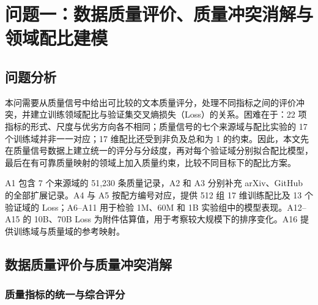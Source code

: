 \setcounter{section}{3}
\section{问题一：数据质量评价、质量冲突消解与领域配比建模}
\label{sec:q1}
\setcounter{equation}{0}
\setcounter{figure}{0}
\setcounter{table}{0}

\subsection{问题分析}

本问需要从质量信号中给出可比较的文本质量评分\cite{fineweb2024}，处理不同指标之间的评价冲突，并建立训练领域配比与验证集交叉熵损失（Loss）的关系。困难在于：22 项指标的形式、尺度与优劣方向各不相同；质量信号的七个来源域与配比实验的 17 个训练域并非一一对应；17 维配比还受到非负及总和为 1 的约束。因此，本文先在质量信号数据上建立统一的评分与分歧度，再对每个验证域分别拟合配比模型，最后在有可靠质量映射的领域上加入质量约束，比较不同目标下的配比方案。

A1 包含 7 个来源域的 51,230 条质量记录，A2 和 A3 分别补充 arXiv、GitHub 的全部扩展记录。A4 与 A5 按配方编号对应，提供 512 组 17 维训练配比及 13 个验证域的 Loss；A6--A11 用于检验 1M、60M 和 1B 实验组中的模型表现。A12--A15 的 10B、70B Loss 为附件估算值，用于考察较大规模下的排序变化。A16 提供训练域与质量域的参考映射。

\subsection{数据质量评价与质量冲突消解}

\subsubsection{质量指标的统一与综合评分}

